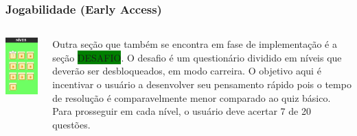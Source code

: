 \documentclass[10pt]{beamer}
\begin{document}
\begin{frame}
\frametitle{Jogabilidade (Early Access)}


\begin{columns}
	
	\includegraphics[width=0.9\linewidth, height=0.9\textheight,keepaspectratio=false]{challenge_levels.png} \pause	
	
	
	
	
	Outra seção que também se encontra em fase de implementação é a seção \colorbox{green}{DESAFIO}. O desafio é um questionário dividido em níveis que deverão ser desbloqueados, em modo carreira. O objetivo aqui é incentivar o usuário a desenvolver seu pensamento rápido pois o tempo de resolução é comparavelmente menor comparado ao quiz básico. Para prosseguir em cada nível, o usuário deve acertar 7 de 20 questões. 
	
\end{columns}


\end{frame}
\end{document}
